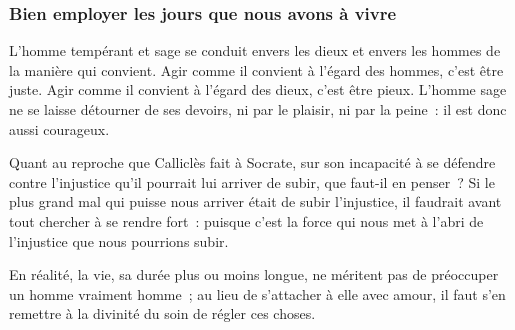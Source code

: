 \documentclass[fontsize=26pt,a4paper]{scrartcl}
\begin{document}
\subsubsection*{Bien employer les jours que nous avons à vivre}


L'homme tempérant et sage se conduit envers les dieux et envers les hommes de la manière qui convient. Agir comme il convient à l'égard des hommes, c'est être juste. Agir comme il convient à l'égard des dieux, c'est être pieux. L'homme sage ne se laisse détourner de ses devoirs, ni par le plaisir, ni par la peine~: il est donc aussi courageux.

Quant au reproche que Calliclès fait à Socrate, sur son incapacité à se défendre contre l'injustice qu'il pourrait lui arriver de subir, que faut-il en penser~? Si le plus grand mal qui puisse nous arriver était de subir l'injustice, il faudrait avant tout chercher à se rendre fort~: puisque c'est la force qui nous met à l'abri de l'injustice que nous pourrions subir.%

En réalité, la vie, sa durée plus ou moins longue, ne méritent pas de préoccuper un homme vraiment homme~; au lieu de s'attacher à elle avec amour, il faut s'en remettre à la divinité du soin de régler ces choses.%
\end{document}
